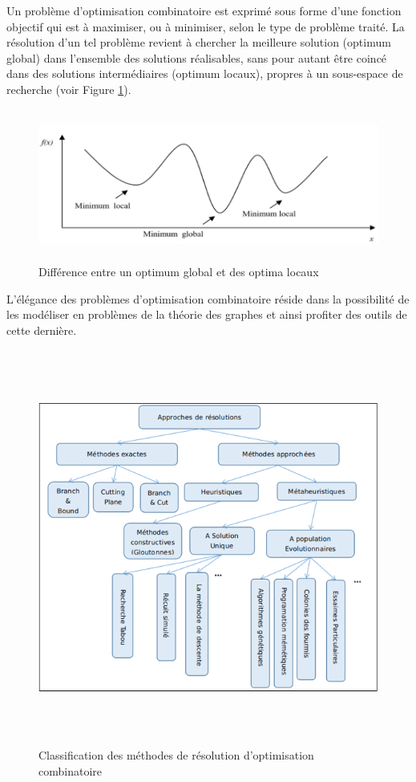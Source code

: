 Un problème d’optimisation combinatoire est exprimé sous forme d’une fonction objectif qui est à maximiser, ou à minimiser, selon le type de problème traité. La résolution d’un tel problème revient à chercher la meilleure solution (optimum global) dans l’ensemble des solutions réalisables, sans pour autant être coincé dans des solutions intermédiaires (optimum locaux), propres à un sous-espace de recherche (voir Figure \ref{fig:DOGOL}).

\begin{figure}[H]
	\centering
	\includegraphics[width=15cm,height=5cm]{Chap2/1.png}
	\caption{Différence entre un optimum global et des optima locaux}
	\label{fig:DOGOL}
\end{figure}

L’élégance des problèmes d’optimisation combinatoire réside dans la possibilité de les modéliser en problèmes de la théorie des graphes et ainsi profiter des outils de cette dernière.

\begin{figure}[H]
	\centering
	\includegraphics[width=15cm,height=13cm]{Chap2/2.png}
	\caption{Classification des méthodes de résolution d’optimisation combinatoire}
	\label{fig:CMROC}
\end{figure}

